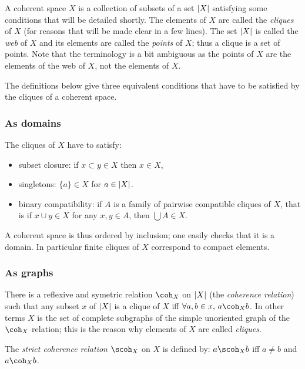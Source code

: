 A coherent space \(X\) is a collection of subsets of a set \(\left|X\right|\)
satisfying some conditions that will be detailed shortly. The elements
of \(X\) are called the \emph{cliques} of \(X\) (for reasons that will
be made clear in a few lines). The set \(\left|X\right|\) is called the
\emph{web} of \(X\) and its elements are called the \emph{points} of
\(X\); thus a clique is a set of points. Note that the terminology is a
bit ambiguous as the points of \(X\) are the elements of the web of
\(X\), not the elements of \(X\).

The definitions below give three equivalent conditions that have to be
satisfied by the cliques of a coherent space.

\subsubsection{As domains}\label{as-domains}

The cliques of \(X\) have to satisfy:

\begin{itemize}
\tightlist
\item
  subset closure: if \(x\subset y\in X\) then \(x\in X\),
\item
  singletons: \(\{a\}\in X\) for \(a\in\left|X\right|\).
\item
  binary compatibility: if \(A\) is a family of pairwise compatible
  cliques of \(X\), that is if \(x\cup y\in X\) for any \(x,y\in A\),
  then \(\bigcup A\in X\).
\end{itemize}

A coherent space is thus ordered by inclusion; one easily checks that it
is a domain. In particular finite cliques of \(X\) correspond to compact
elements.

\subsubsection{As graphs}\label{as-graphs}

There is a reflexive and symetric relation \(\coh_X\) on \(\left|X\right|\) (the
\emph{coherence relation}) such that any subset \(x\) of \(\left|X\right|\) is a
clique of \(X\) iff \(\forall a,b\in x,\, a\coh_X b\). In other terms
\(X\) is the set of complete subgraphs of the simple unoriented graph of
the \(\coh_X\) relation; this is the reason why elements of \(X\) are
called \emph{cliques}.

The \emph{strict coherence relation} \(\scoh_X\) on \(X\) is defined by:
\(a\scoh_X b\) iff \(a\neq b\) and \(a\coh_X b\).

